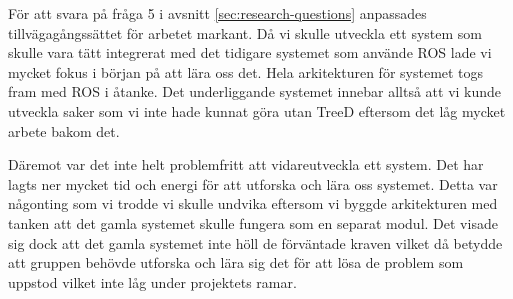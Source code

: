 För att svara på fråga 5 i avsnitt \ref{sec:research-questions} anpassades tillvägagångssättet för arbetet markant. Då vi skulle utveckla ett system som skulle vara tätt integrerat med det tidigare systemet som använde ROS lade vi mycket fokus i början på att lära oss det. Hela arkitekturen för systemet togs fram med ROS i åtanke. Det underliggande systemet innebar alltså att vi kunde utveckla saker som vi inte hade kunnat göra utan TreeD eftersom det låg mycket arbete bakom det.

Däremot var det inte helt problemfritt att vidareutveckla ett system. Det har lagts ner mycket tid och energi för att utforska och lära oss systemet. Detta var någonting som vi trodde vi skulle undvika eftersom vi byggde arkitekturen med tanken att det gamla systemet skulle fungera som en separat modul. Det visade sig dock att det gamla systemet inte höll de förväntade kraven vilket då betydde att gruppen behövde utforska och lära sig det för att lösa de problem som uppstod vilket inte låg under projektets ramar. 





